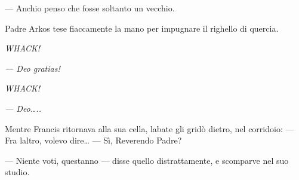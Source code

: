 --- Anch\textquotesingle io penso che fosse soltanto un vecchio.

Padre Arkos tese fiaccamente la mano per impugnare il righello di
quercia.

\emph{WHACK!}

\emph{--- Deo gratias!}

\emph{WHACK!}

\emph{--- Deo\ldots..}

Mentre Francis ritornava alla sua cella, l\textquotesingle abate gli
gridò dietro, nel corridoio: --- Fra l\textquotesingle altro, volevo
dire\ldots{} --- Sì, Reverendo Padre?

--- Niente voti, quest\textquotesingle anno --- disse quello
distrattamente, e scomparve nel suo studio.
